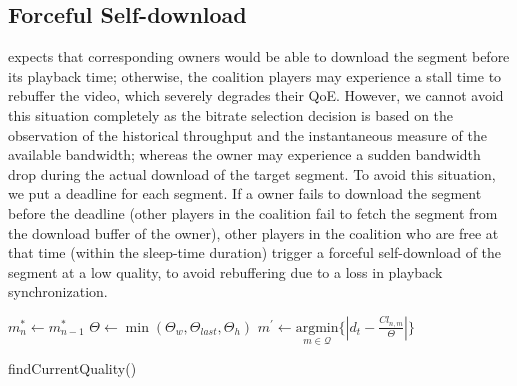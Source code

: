 \subsection{Forceful Self-download} {\our} expects that corresponding owners would be able to download the segment before its playback time; otherwise, the coalition players may experience a stall time to rebuffer the video, which severely degrades their QoE. However, we cannot avoid this situation completely as the bitrate selection decision is based on the observation of the historical throughput and the instantaneous measure of the available bandwidth; whereas the owner may experience a sudden bandwidth drop during the actual download of the target segment. To avoid this situation, we put a deadline for each segment. If a owner fails to download the segment before the deadline (other players in the coalition fail to fetch the segment from the download buffer of the owner), other players in the coalition who are free at that time (within the sleep-time duration) trigger a forceful self-download of the segment at a low quality, to avoid rebuffering due to a loss in playback synchronization.
\begin{algorithm}[!ht]
	\DontPrintSemicolon
	$m^*_{n} \leftarrow m^*_{n-1}$ \; \label{algo:chap06:quality:line:mstar}
	$\varTheta \leftarrow \min(\varTheta_w, \varTheta_{last}, \varTheta_h)$ \; \label{algo:chap06:quality:line:theta}
	$m^\prime \leftarrow \underset{m \in \mathcal{Q}}{\mathrm{argmin}} \{\left| d_t - \frac{Cl_{n,m}}{\varTheta}\right| \} $\; \label{algo:chap06:quality:line:mprime}
	\caption{\label{algo:chap06:quality}findCurrentQuality()}
\end{algorithm}
